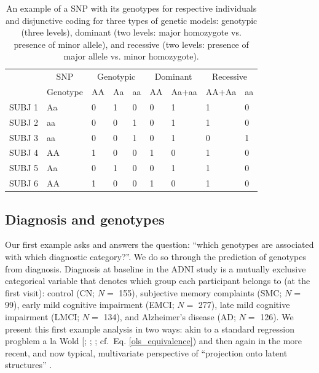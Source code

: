 \documentclass[12pt]{article}
\begin{document}
\begin{table}[!h]

\caption{\label{tab:unnamed-chunk-2}\label{table:snps_models_disj} An example of a SNP with its genotypes for respective individuals and disjunctive coding for three types of genetic models: genotypic (three levels), dominant (two levels: major homozygote vs. presence of minor allele), and recessive (two levels: presence of major allele vs. minor homozygote).}
\centering
\begin{tabular}[t]{lllllllll}
\toprule
\multicolumn{1}{c}{ } & \multicolumn{1}{c}{SNP} & \multicolumn{3}{c}{Genotypic} & \multicolumn{2}{c}{Dominant} & \multicolumn{2}{c}{Recessive} \\
\cmidrule(l{2pt}r{2pt}){2-2} \cmidrule(l{2pt}r{2pt}){3-5} \cmidrule(l{2pt}r{2pt}){6-7} \cmidrule(l{2pt}r{2pt}){8-9}
  & Genotype & AA & Aa & aa & AA & Aa+aa & AA+Aa & aa\\
\midrule
SUBJ 1 & Aa & 0 & 1 & 0 & 0 & 1 & 1 & 0\\
SUBJ 2 & aa & 0 & 0 & 1 & 0 & 1 & 1 & 0\\
SUBJ 3 & aa & 0 & 0 & 1 & 0 & 1 & 0 & 1\\
SUBJ 4 & AA & 1 & 0 & 0 & 1 & 0 & 1 & 0\\
SUBJ 5 & Aa & 0 & 1 & 0 & 0 & 1 & 1 & 0\\
\addlinespace
SUBJ 6 & AA & 1 & 0 & 0 & 1 & 0 & 1 & 0\\
\bottomrule
\end{tabular}
\end{table}

\hypertarget{diagnosis-and-genotypes}{%
\subsection{Diagnosis and genotypes}\label{diagnosis-and-genotypes}}

\label{section:plscarda}

Our first example asks and answers the question: ``which genotypes are
associated with which diagnostic category?''. We do so through the
prediction of genotypes from diagnosis. Diagnosis at baseline in the
ADNI study is a mutually exclusive categorical variable that denotes
which group each participant belongs to (at the first visit): control
(CN; \(N=\) 155), subjective memory complaints (SMC; \(N=\) 99), early
mild cognitive impairment (EMCI; \(N=\) 277), late mild cognitive
impairment (LMCI; \(N=\) 134), and Alzheimer's disease (AD; \(N=\) 126).
We present this first example analysis in two ways: akin to a standard
regression progblem a la Wold {[}\citet{wold_soft_1975};
\citet{wold_collinearity_1984}; \citet{wold_principal_1987}; cf.~Eq.
\ref{ols_equivalence}) and then again in the more recent, and now
typical, multivariate perspective of ``projection onto latent
structures'' \citep{abdi_partial_2010-1}.
\end{document}
